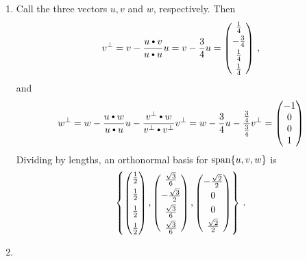 \begin{enumerate}
\item Call the three vectors $u,v$ and $w$, respectively. Then
\[
v^\perp=v-\frac{u\dotprod v}{u\dotprod u} u =v-\frac34 u = \begin{pmatrix}\frac14 \\[1mm] -\frac34 \\[1mm] \frac14\\[1mm] \frac14\end{pmatrix}\, ,
\]
and
\[
w^\perp = w - \frac{u\dotprod w}{u\dotprod u} u-\frac{v^\perp\dotprod w}{v^\perp\dotprod v^\perp} v^\perp
=w-\frac{3}{4} u -\frac{\frac34}{\frac34}v^\perp =\begin{pmatrix}-1\\0\\0\\1\end{pmatrix}
\]
Dividing by lengths, an orthonormal basis for $\operatorname{span}\{u,v,w\}$ is
\[
\left\{\begin{pmatrix}\frac12\\[2mm]\frac12\\[2mm]\frac12\\[2mm]\frac12\end{pmatrix},
\begin{pmatrix}\frac{\sqrt{3}}6\\[1mm]-\frac{\sqrt{3}}2\\[1mm]\frac{\sqrt{3}}6\\[1mm]\frac{\sqrt{3}}6\end{pmatrix},
\begin{pmatrix}-\frac{\sqrt{2}}2\\[1mm]\mc0\\[1mm]\mc0\\[1mm]\frac{\sqrt{2}}2\end{pmatrix}
\right\}\, .
\]
\item 


\end{enumerate}
